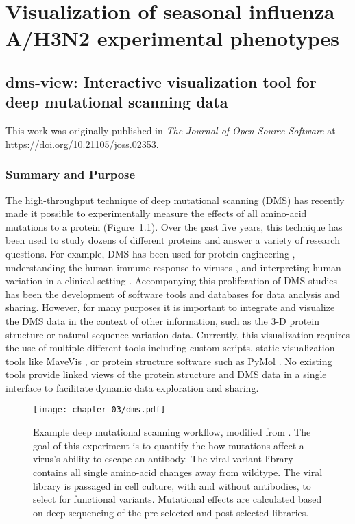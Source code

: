 \chapter{Visualization of seasonal influenza A/H3N2 experimental phenotypes}

\section{dms-view: Interactive visualization tool for deep mutational scanning data}

This work was originally published in \emph{The Journal of Open Source Software} at \url{https://doi.org/10.21105/joss.02353}.

\subsection{Summary and Purpose}

The high-throughput technique of deep mutational scanning (DMS) \citep{fowler2014deep} has recently made it possible to experimentally measure the effects of all amino-acid mutations to a protein (Figure~\ref{fig:dms}).
Over the past five years, this technique has been used to study dozens of different proteins \citep{esposito2019mavedb} and answer a variety of research questions.
For example, DMS has been used for protein engineering \citep{wrenbeck2017deep}, understanding the human immune response to viruses \citep{Lee2019}, and interpreting human variation in a clinical setting \citep{starita2017variant,gelman2019recommendations}.
Accompanying this proliferation of DMS studies has been the development of software tools \citep{bloom2015software,rubin2017statistical} and databases \citep{esposito2019mavedb} for data analysis and sharing.
However, for many purposes it is important to integrate and visualize the DMS data in the context of other information, such as the 3-D protein structure or natural sequence-variation data.
Currently, this visualization requires the use of multiple different tools including custom scripts, static visualization tools like MaveVis \citep{esposito2019mavedb}, or protein structure software such as PyMol \citep{PyMOL}.
No existing tools provide linked views of the protein structure and DMS data in a single interface to facilitate dynamic data exploration and sharing.

\begin{figure}
  \centering
  \texttt{[image: chapter\_03/dms.pdf]}
  \caption{Example deep mutational scanning workflow, modified from \citet{Lee2019}. The goal of this experiment is to quantify the how mutations affect a virus's ability to escape an antibody. The viral variant library contains all single amino-acid changes away from wildtype. The viral library is passaged in cell culture, with and without antibodies, to select for functional variants. Mutational effects are calculated based on deep sequencing of the pre-selected and post-selected libraries.\label{fig:dms}}
\end{figure}


